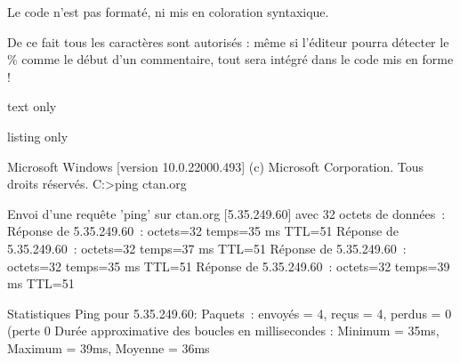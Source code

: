 \documentclass[a4paper,french,11pt]{article}
\begin{document}
\begin{noteblock}
Le \textsf{code} n'est pas formaté, ni mis en coloration syntaxique.

De ce fait tous les caractères sont autorisés : même si l'éditeur pourra détecter le \% comme le début d'un commentaire, tout sera intégré dans le code mis en forme !
\end{noteblock}


\begin{PresCodeSortiePL}{text only}
\end{PresCodeSortiePL}

\begin{PresCodeTexPL}{listing only}
\begin{TerminalWin}[15cm]{} %
Microsoft Windows [version 10.0.22000.493]
(c) Microsoft Corporation. Tous droits réservés.
C:\Users\test>ping ctan.org

Envoi d'une requête 'ping' sur ctan.org [5.35.249.60] avec 32 octets de données :
Réponse de 5.35.249.60 : octets=32 temps=35 ms TTL=51
Réponse de 5.35.249.60 : octets=32 temps=37 ms TTL=51
Réponse de 5.35.249.60 : octets=32 temps=35 ms TTL=51
Réponse de 5.35.249.60 : octets=32 temps=39 ms TTL=51

Statistiques Ping pour 5.35.249.60:
Paquets : envoyés = 4, reçus = 4, perdus = 0 (perte 0%
Durée approximative des boucles en millisecondes :
Minimum = 35ms, Maximum = 39ms, Moyenne = 36ms
\end{TerminalWin}

\end{PresCodeTexPL}
\end{document}
